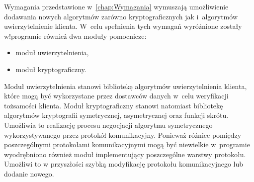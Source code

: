 Wymagania przedstawione w~\ref{chap:Wymagania} wymuszają umożliwienie
dodawania nowych algorytmów zarówno kryptograficznych jak i~algorytmów
uwierzytelnienie klienta. W~celu spełnienia tych wymagań wyróżnione
zostały w!programie również dwa moduły pomocnicze:

\begin{itemize}
\item moduł uwierzytelnienia,
\item moduł kryptograficzny.
\end{itemize}

Moduł uwierzytelnienia stanowi bibliotekę algorytmów uwierzytelnienia
klienta, które mogą być wykorzystane przez dostawców danych w~celu
weryfikacji tożsamości klienta. Moduł kryptograficzny stanowi
natomiast bibliotekę algorytmów kryptografii symetrycznej,
asymetrycznej oraz funkcji skrótu. Umożliwia to realizację procesu
negocjacji algorytmu symetrycznego wykorzystywanego przez protokół
komunikacyjny. Ponieważ różnice pomiędzy poszczególnymi protokołami
komunikacyjnymi mogą być niewielkie w~programie wyodrębniono również
moduł implementujący poszczególne warstwy protokołu. Umożliwi to w
przyszłości szybką modyfikację protokołu komunikacyjnego lub dodanie
nowego.

